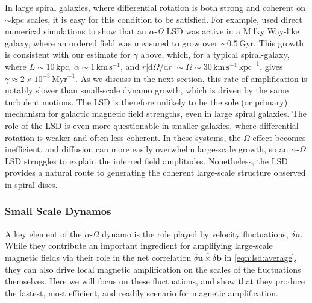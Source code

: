 \documentclass[12pt,twoside]{extreport}
\newcommand{\mVector}[1]{\bm{#1}} %
\newcommand{\mdd}[1]{\mathrm{d} #1}
\providecommand{\DIFaddtex}[1]{{\protect\color{DIFgreen}\uwave{#1}}} %
\providecommand{\DIFaddbegin}{} %
\providecommand{\DIFaddend}{} %
\providecommand{\DIFadd}[1]{\texorpdfstring{\DIFaddtex{#1}}{#1}} %
\providecommand{\DIFaddincludegraphics}[2][]{{\color{DIFgreen}\fbox{\DIFOincludegraphics[#1]{#2}}}} %
\DeclareRobustCommand{\DIFaddbegin}{\DIFOaddbegin \let\includegraphics\DIFaddincludegraphics} %
\DeclareRobustCommand{\DIFaddend}{\DIFOaddend \let\includegraphics\DIFOincludegraphics} %
\begin{document}
In large spiral galaxies, where differential rotation is both strong and coherent on $\sim \mathrm{kpc}$ scales, it is easy for this condition to be satisfied. For example, \citet{ntormousi2020dynamo} used direct numerical simulations to show that an $\alpha$-$\Omega$ LSD was active in a Milky Way-like galaxy, where an ordered field was measured to grow over $\sim 0.5 \,\mathrm{Gyr}$. This growth is consistent with our estimate for $\gamma$ above, which, for a typical spiral-galaxy, where $L \sim 10 \,\mathrm{kpc}$, $\alpha \sim 1 \,\mathrm{km} \,\mathrm{s}^{-1}$, and $r |\mdd \Omega / \mdd r| \sim \Omega \sim 30 \,\mathrm{km} \,\mathrm{s}^{-1} \,\mathrm{kpc}^{-1}$, gives $\gamma \approx 2\times 10^{-3} \,\mathrm{Myr}^{-1}$. As we discuss in the next section, this rate of amplification is notably slower than small-scale dynamo growth, which is driven by the same turbulent motions. The LSD is therefore unlikely to be the sole (or primary) mechanism for galactic magnetic field strengths, even in large spiral galaxies. The role of the LSD is even more questionable in smaller galaxies, where differential rotation is weaker and often less coherent. In these systems, the $\Omega$-effect becomes inefficient, and diffusion can more easily overwhelm large-scale growth, so an $\alpha$-$\Omega$ LSD struggles to explain the inferred field amplitudes. Nonetheless, the LSD provides a natural route to generating the coherent large-scale structure observed in spiral discs.


\subsubsection{Small Scale Dynamos}
\label{sec:evolve:ssd}

A key element of the $\alpha$-$\Omega$ dynamo is the role played by velocity fluctuations, $\delta\mVector{u}$. While they contribute an important ingredient for amplifying large-scale magnetic fields via their role in the net correlation $\overline{\delta\mVector{u}\times\delta\mVector{b}}$ in \autoref{eqn:lsd:average}, they can also drive local magnetic amplification on the scales of the fluctuations themselves. Here we will focus on these fluctuations, and show that they produce the fastest, most efficient, and readily \DIFaddbegin \DIFadd{available }\DIFaddend scenario for magnetic amplification.
\end{document}
